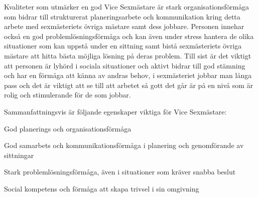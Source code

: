\documentclass[10pt]{article}
\def\post{Vice Sexmästare}
\begin{document}

Kvaliteter som utmärker en god Vice Sexmästare är stark organisationsförmåga som bidrar till strukturerat planeringsarbete och kommunikation kring detta arbete med sexmästeriets övriga mästare samt dess jobbare. Personen innehar också en god problemlösningsförmåga och kan även under stress hantera de olika situationer som kan uppstå under en sittning samt bistå sexmästeriets övriga mästare att hitta bästa möjliga lösning på deras problem. Till sist är det viktigt att personen är lyhörd i sociala situationer och aktivt bidrar till god stämning och har en förmåga att känna av andras behov, i sexmästeriet jobbar man långa pass och det är viktigt att se till att arbetet så gott det går är på en nivå som är rolig och stimulerande för de som jobbar.


Sammanfattningsvis är följande egenskaper viktiga för {\post}:
\begin{dashlist}
    \item God planerings och organisationsförmåga 
    \item God samarbets och kommunikationsförmåga i planering och genomförande av sittningar
    \item Stark problemlösningsförmåga, även i situationer som kräver snabba beslut
    \item Social kompetens och förmåga att skapa trivsel i sin omgivning
\end{dashlist}

\end{document}
